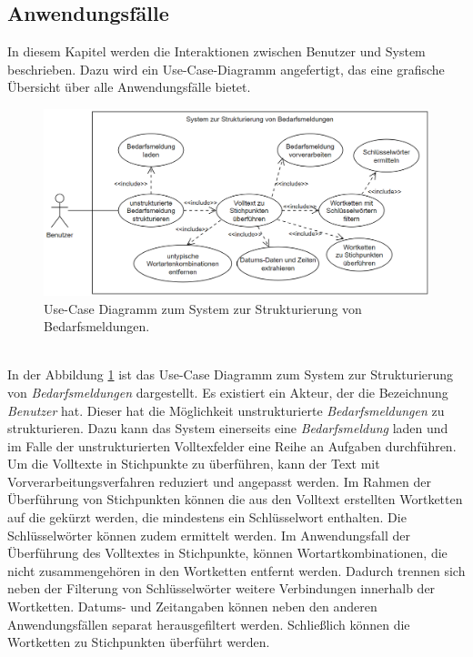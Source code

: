 \subsection{Anwendungsfälle}
\label{sec:usecase}
In diesem Kapitel werden die Interaktionen zwischen Benutzer und System beschrieben. Dazu wird ein Use-Case-Diagramm angefertigt, das eine grafische Übersicht über alle Anwendungsfälle bietet.
\begin{figure}[H]
	\centering  
	\includegraphics[width=\linewidth]{Abbildungen/use-case.png}
	\caption{Use-Case Diagramm zum System zur Strukturierung von Bedarfsmeldungen.}
	\label{fig:usecasediagrammwirklich}
\end{figure}\mbox{} \\
In der Abbildung \ref{fig:usecasediagrammwirklich} ist das Use-Case Diagramm zum System zur Strukturierung von \emph{Bedarfsmeldungen} dargestellt. Es existiert ein Akteur, der die Bezeichnung \emph{Benutzer} hat. Dieser hat die Möglichkeit unstrukturierte \emph{Bedarfsmeldungen} zu strukturieren. Dazu kann das System einerseits eine \emph{Bedarfsmeldung} laden und im Falle der unstrukturierten Volltexfelder eine Reihe an Aufgaben durchführen. Um die Volltexte in Stichpunkte zu überführen, kann der Text mit Vorverarbeitungsverfahren reduziert und angepasst werden. Im Rahmen der Überführung von Stichpunkten können die aus den Volltext erstellten Wortketten auf die gekürzt werden, die mindestens ein Schlüsselwort enthalten. Die Schlüsselwörter können zudem ermittelt werden. Im Anwendungsfall der Überführung des Volltextes in Stichpunkte, können Wortartkombinationen, die nicht zusammengehören in den Wortketten entfernt werden. Dadurch trennen sich neben der Filterung von Schlüsselwörter weitere Verbindungen innerhalb der Wortketten. Datums- und Zeitangaben können neben den anderen Anwendungsfällen separat herausgefiltert werden. Schließlich können die Wortketten zu Stichpunkten überführt werden.
